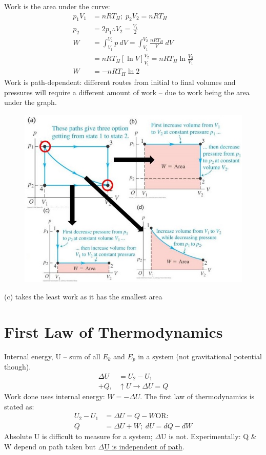 \documentclass[a4paper, 11pt, normalem]{report}
\begin{document}
Work is the area under the curve:
\begin{align}
    p_{1}V_{1} &= nRT_{H}; \; p_{2}V_{2} = nRT_{H} \\
    p_{2} &= 2p_{1} \therefore V_{2} = \frac{V_{1}}{2} \\
	W &= \int_{V_{1}}^{V_{2}} p\:dV = \int_{V_{1}}^{V_{2}} \frac{nRT_{H}}{V}\:dV \\
      &= nRT_{H}[\ln{V}]_{V_{1}}^{V_{2}} = nRT_{H}\ln{\frac{V_{2}}{V_{1}}} \\
    W &= -nRT_{H}\ln{2}
\end{align}
Work is path-dependent: different routes from initial to final volumes and pressures will require a different amount of work -- due to work being the area under the graph.
\begin{figure}[H]
    \centering
    \includegraphics[scale=0.7]{Paths.jpg}
\end{figure}
(c) takes the least work as it has the smallest area

\section{First Law of Thermodynamics}
Internal energy, U -- sum of all $E_{k}$ and $E_{p}$ in a system (not gravitational potential though).
\begin{align}
    {\Delta}U &= U_{2} - U_{1} \\
    + Q, &\uparrow U \rightarrow {\Delta}U = Q
\end{align}
Work done uses internal energy: $W = -{\Delta}U$.
The first law of thermodynamics is stated as:
\begin{align}
    U_{2} - U_{1} &= {\Delta}U = Q - W \text{OR: }\\
    Q &= {\Delta}U + W; \; dU = dQ - dW
\end{align}
Absolute U is difficult to measure for a system; $\Delta$U is not.
Experimentally: Q \& W depend on path taken but \underline{$\Delta$U is independent of path}.
\end{document}
